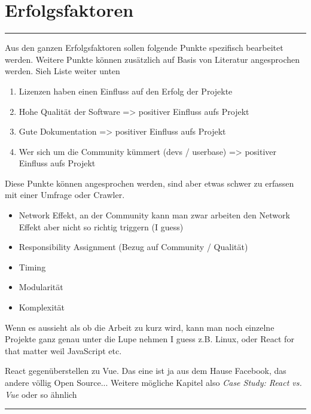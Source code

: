 \chapter{Erfolgsfaktoren}

\textcolor{red}{\rule{\textwidth}{3pt}}


\bigskip
\noindent
\textbf{}

\noindent
Aus den ganzen Erfolgsfaktoren sollen folgende Punkte spezifisch bearbeitet werden. Weitere Punkte können zusätzlich auf Basis von
Literatur angesprochen werden. Sieh Liste weiter unten

\begin{enumerate}
    \item Lizenzen haben einen Einfluss auf den Erfolg der Projekte
    \item Hohe Qualität der Software  => positiver Einfluss aufs Projekt
    \item Gute Dokumentation => positiver Einfluss aufs Projekt
    \item Wer sich um die Community kümmert (devs / userbase) => positiver Einfluss aufs Projekt
\end{enumerate}

\noindent
Diese Punkte können angesprochen werden, sind aber etwas schwer zu erfassen mit einer Umfrage oder Crawler.

\begin{itemize}
    \item Network Effekt, an der Community kann man zwar arbeiten den Network Effekt aber nicht so richtig triggern (I guess)
    \item Responsibility Assignment (Bezug auf Community / Qualität)
    \item Timing
    \item Modularität
    \item Komplexität
\end{itemize}


Wenn es aussieht als ob die Arbeit zu kurz wird, kann man noch einzelne Projekte ganz genau unter die Lupe nehmen I guess
z.B. Linux, oder React for that matter weil JavaScript etc.

React gegenüberstellen zu Vue. Das eine ist ja aus dem Hause Facebook, das andere völlig Open Source...
Weitere mögliche Kapitel also \textit{Case Study: React vs. Vue} oder so ähnlich


\noindent
\textcolor{red}{\rule{\textwidth}{3pt}}

